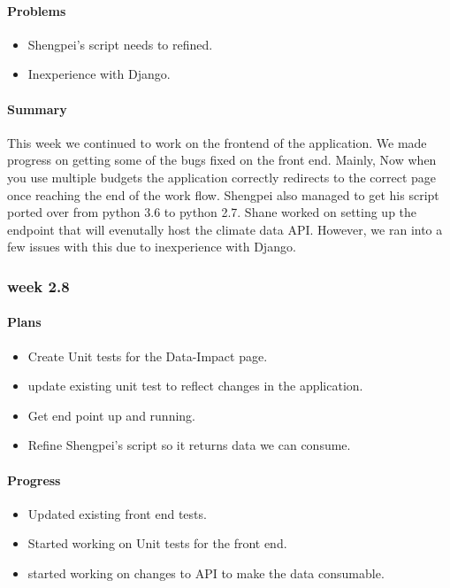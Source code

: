 \documentclass[onecolumn, draftclsnofoot,10pt, compsoc]{article}
\begin{document}
				\paragraph{Problems} \hfill \break
				\begin{itemize}
					\item Shengpei's script needs to refined.
					\item Inexperience with Django.
				\end{itemize}
			\paragraph{Summary} \hfill \break
			This week we continued to work on the frontend of the application. We made progress on getting some of the bugs fixed on the front end. Mainly, Now when you use multiple budgets the application correctly redirects to the correct page once reaching the end of the work flow. Shengpei also managed to get his script ported over from python 3.6 to python 2.7. Shane worked on setting up the endpoint that will evenutally host the climate data API. However, we ran into a few issues with this due to inexperience with Django.\\

		\subsubsection{week 2.8}
			\paragraph{Plans} \hfill \break
				\begin{itemize}
					\item Create Unit tests for the Data-Impact page.
					\item update existing unit test to reflect changes in the application.
					\item Get end point up and running.
					\item Refine Shengpei's script so it returns data we can consume.
				\end{itemize}
			\paragraph{Progress} \hfill \break
				\begin{itemize}
					\item Updated existing front end tests.
					\item Started working on Unit tests for the front end.
					\item started working on changes to API to make the data consumable.
				\end{itemize}
\end{document}
